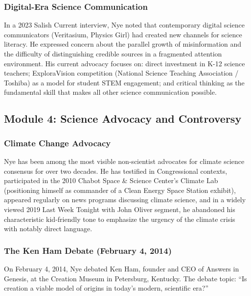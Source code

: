 \documentclass[11pt,letterpaper]{article}
\begin{document}
\subsubsection{Digital-Era Science Communication}

In a 2023 Salish Current interview, Nye noted that contemporary digital science communicators (Veritasium, Physics Girl) had created new channels for science literacy. He expressed concern about the parallel growth of misinformation and the difficulty of distinguishing credible sources in a fragmented attention environment. His current advocacy focuses on: direct investment in K-12 science teachers; ExploraVision competition (National Science Teaching Association / Toshiba) as a model for student STEM engagement; and critical thinking as the fundamental skill that makes all other science communication possible.

\subsection{Module 4: Science Advocacy and Controversy}

\subsubsection{Climate Change Advocacy}

Nye has been among the most visible non-scientist advocates for climate science consensus for over two decades. He has testified in Congressional contexts, participated in the 2010 Chabot Space \& Science Center's Climate Lab (positioning himself as commander of a Clean Energy Space Station exhibit), appeared regularly on news programs discussing climate science, and in a widely viewed 2019 Last Week Tonight with John Oliver segment, he abandoned his characteristic kid-friendly tone to emphasize the urgency of the climate crisis with notably direct language.

\subsubsection{The Ken Ham Debate (February 4, 2014)}

On February 4, 2014, Nye debated Ken Ham, founder and CEO of Answers in Genesis, at the Creation Museum in Petersburg, Kentucky. The debate topic: ``Is creation a viable model of origins in today's modern, scientific era?''
\end{document}
